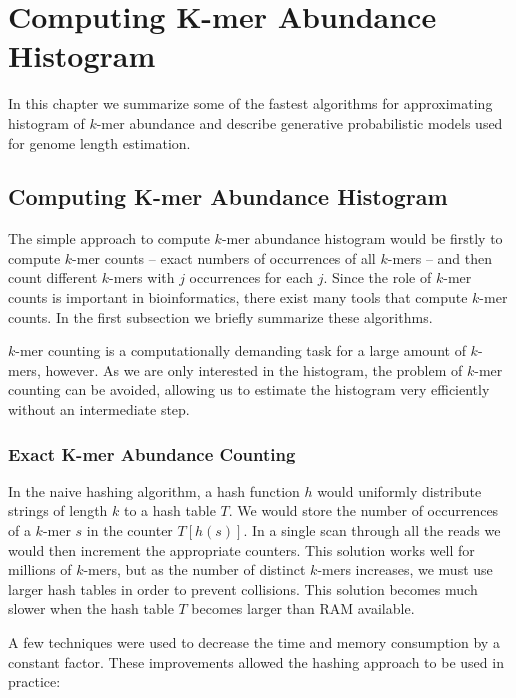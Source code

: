 \chapter{Computing K-mer Abundance Histogram}

In this chapter we summarize some of the fastest algorithms for approximating histogram of $k$-mer abundance 
and describe generative probabilistic models used for genome length estimation.

\section{Computing K-mer Abundance Histogram}
\label{sec:algorithms}

The simple approach to compute $k$-mer abundance histogram would be firstly to compute $k$-mer counts --
exact numbers of occurrences of all $k$-mers -- and then count different $k$-mers with $j$ occurrences for each $j$.
Since the role of $k$-mer counts is important in bioinformatics, there exist many tools that
compute $k$-mer counts. In the first subsection we briefly summarize these algorithms.

$k$-mer counting is a computationally demanding task for a large amount of $k$-mers, however.
As we are only interested in the histogram, the problem of $k$-mer counting can be avoided,
allowing us to estimate the histogram very efficiently without an intermediate step.

\subsection{Exact K-mer Abundance Counting}
\label{sec:exact-algorithms}
In the naive hashing algorithm, a hash function $h$ would uniformly distribute strings of length $k$ to a hash table $T$. 
We would store the number of occurrences of a $k$-mer $s$ in the counter $T[h(s)]$. In a single scan through all the reads we
would then increment the appropriate counters. This solution works well for millions of $k$-mers, but as
the number of distinct $k$-mers increases, we must use larger hash tables in order to prevent collisions.
This solution becomes much slower when the hash table $T$ becomes larger than RAM available.

A few techniques were used to decrease the time and memory consumption by a constant factor. 
These improvements allowed the hashing approach to be used in practice:


